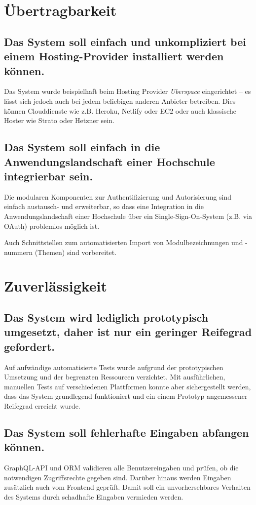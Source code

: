 \documentclass[a4paper,11pt,listof=numbered,glossary=totoc,parskip=half,toc=bib]{scrreprt}
\begin{document}
\begin{appendices}
	\section{Übertragbarkeit}

	\subsection{Das System soll einfach und unkompliziert bei einem Hosting-Provider installiert werden können.}
	Das System wurde beispielhaft beim Hosting Provider \textit{Uberspace} eingerichtet -- es lässt sich jedoch auch bei jedem beliebigen anderen Anbieter betreiben. Dies können Clouddienste wie z.B. Heroku, Netlify oder EC2 oder auch klassische Hoster wie Strato oder Hetzner sein.
	
	
	\subsection{Das System soll einfach in die Anwendungslandschaft einer Hochschule integrierbar sein.}
	Die modularen Komponenten zur Authentifizierung und Autorisierung sind einfach austausch- und erweiterbar, so dass eine Integration in die Anwendungslandschaft einer Hochschule über ein Single-Sign-On-System (z.B. via OAuth) problemlos möglich ist. 

	Auch Schnittstellen zum automatisierten Import von Modulbezeichnungen und -nummern (Themen) sind vorbereitet.	
	
	\section{Zuverlässigkeit}
	\subsection{Das System wird lediglich prototypisch umgesetzt, daher ist nur ein geringer Reifegrad gefordert.}
	Auf aufwändige automatisierte Tests wurde aufgrund der prototypischen Umsetzung und der begrenzten Ressourcen verzichtet. Mit ausführlichen, manuellen Tests auf verschiedenen Plattformen konnte aber sichergestellt werden, dass das System grundlegend funktioniert und ein einem Prototyp angemessener Reifegrad erreicht wurde.

	\subsection{Das System soll fehlerhafte Eingaben abfangen können.}
	GraphQL-API und ORM validieren alle Benutzereingaben und prüfen, ob die notwendigen Zugriffsrechte gegeben sind. Darüber hinaus werden Eingaben zusätzlich auch vom Frontend geprüft. Damit soll ein unvorhersehbares Verhalten des Systems durch schadhafte Eingaben vermieden werden.
	

\end{appendices}
\end{document}
